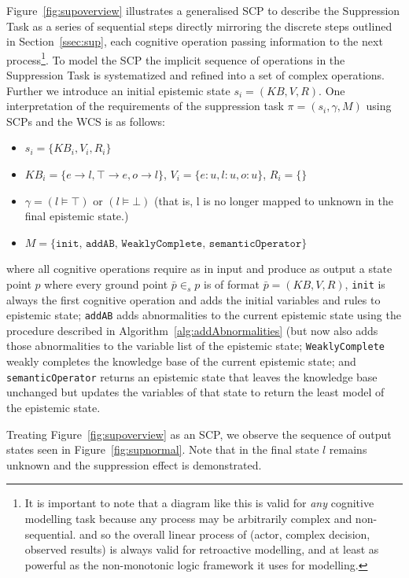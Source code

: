 \documentclass{article}
\begin{document}
Figure~\ref{fig:supoverview} illustrates a generalised SCP to describe the Suppression Task as a series of sequential steps directly mirroring the discrete steps outlined in Section~\ref{ssec:sup}, each cognitive operation passing information to the next process\footnote{It is important to note that a diagram like this is valid for \textit{any} cognitive modelling task because any process may be arbitrarily complex and non-sequential. and so the overall linear process of (actor, complex decision, observed results) is always valid for retroactive modelling, and at least as powerful as the non-monotonic logic framework it uses for modelling.}. To model the SCP the implicit sequence of operations in the Suppression Task is systematized and refined into a set of complex operations. Further we introduce an initial epistemic state $s_i=(KB,V,R)$. One interpretation of the requirements of the suppression task $\pi=(s_i,\gamma,M)$ using SCPs and the WCS is as follows: 
\begin{itemize}
\item $s_i=\{KB_i, V_i, R_i\}$
\item $KB_i=\{e \rightarrow l, \top \rightarrow e, o \rightarrow l\}$, $V_i=\{e:u, l:u, o:u\}$, $R_i=\{\}$
\item $\gamma = (l\models \top) $ or $(l \models \bot)$ (that is, l is no longer mapped to unknown in the final epistemic state.)
\item $M=\{\texttt{init, addAB, WeaklyComplete, semanticOperator}\}$
\end{itemize}

where all cognitive operations require as in input and produce as output a state point $p$ where every ground point $\bar{p} \in_s p$ is of format $\bar{p}=(KB,V,R)$, \texttt{init} is always the first cognitive operation and adds the initial variables and rules to epistemic state; \texttt{addAB} adds abnormalities to the current epistemic state using the procedure described in Algorithm~\ref{alg:addAbnormalities} (but now also adds those abnormalities to the variable list of the epistemic state; \texttt{WeaklyComplete} weakly completes the knowledge base of the current epistemic state; and \texttt{semanticOperator} returns an epistemic state that leaves the knowledge base unchanged but updates the variables of that state to return the least model of the epistemic state.

Treating Figure~\ref{fig:supoverview} as an SCP, we observe the sequence of output states seen in Figure~\ref{fig:supnormal}. Note that in the final state $l$ remains unknown and the suppression effect is demonstrated.
\end{document}
